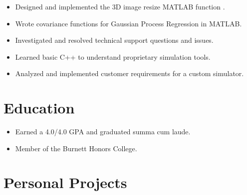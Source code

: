 \documentclass[letterpaper]{resume}
\begin{document}
\begin{minipage}[t]{0.72\columnwidth}
\sectionspace

\vspace{2pt}
\begin{itemize}
\item Designed and implemented the 3D image resize MATLAB function .
\item Wrote covariance functions for Gaussian Process Regression in MATLAB.
\item Investigated and resolved technical support questions and issues.
\end{itemize}

\sectionspace

\vspace{2pt}
\begin{itemize}
\item Learned basic C++ to understand proprietary simulation tools.
\item Analyzed and implemented customer requirements for a custom simulator.
\end{itemize}

\sectionspace


\section{Education}

\vspace{2pt}
\begin{itemize}
\item Earned a 4.0/4.0 GPA and graduated summa cum laude.
\item Member of the Burnett Honors College.
\end{itemize}

\sectionspace


\section{Personal Projects}


\end{minipage}
\end{document}

